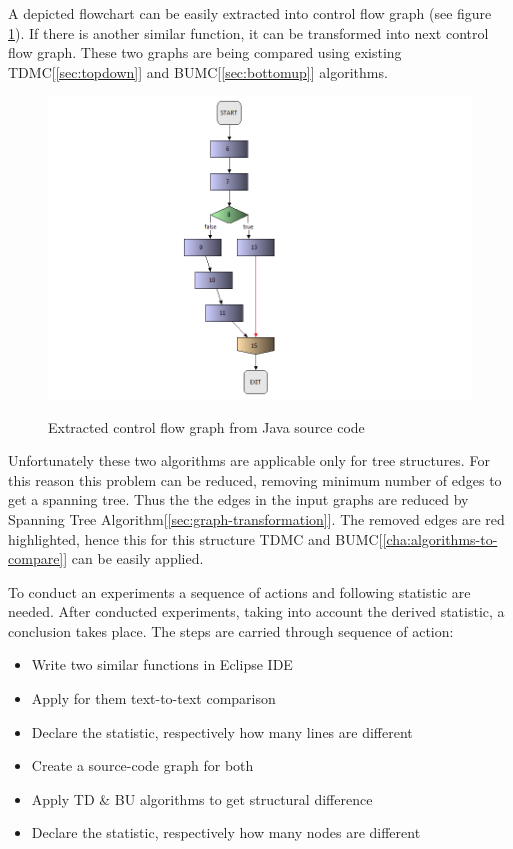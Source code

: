 \documentclass{report}
\begin{document}
A depicted flowchart can be easily extracted into control flow graph (see figure \ref{fig:control-flow-graph}). If there is another similar function, it can be transformed into next control flow graph. These two graphs are being compared using existing TDMC[\ref{sec:topdown}] and BUMC[\ref{sec:bottomup}] algorithms. 

\begin{figure}
  \centering
  \includegraphics[width=1.00\textwidth]{Figures/Java-flowchart-exp/control-flow-graph.png}\\[0.1cm]
  \caption[Extracted control flow graph from Java source code]{Extracted control flow graph from Java source code}
  \label{fig:control-flow-graph}
\end{figure}

Unfortunately these two algorithms are applicable only for tree structures. For this reason this problem can be reduced, removing minimum number of edges to get a spanning tree. Thus the the edges in the input graphs are reduced by Spanning Tree Algorithm[\ref{sec:graph-transformation}]. The removed edges are red highlighted, hence this for this structure TDMC and BUMC[\ref{cha:algorithms-to-compare}] can be easily applied.

To conduct an experiments a sequence of actions and following statistic are needed. After conducted experiments, taking into account the derived statistic, a conclusion takes place. The steps are carried through sequence of action:
\begin{itemize}
	\item Write two similar functions in Eclipse IDE
	\item Apply for them text-to-text comparison
	\item Declare the statistic, respectively how many lines are different		
	\item Create a source-code graph for both
	\item Apply TD \& BU algorithms to get structural difference	
	\item Declare the statistic, respectively how many nodes are different			
\end{itemize}
\end{document}
